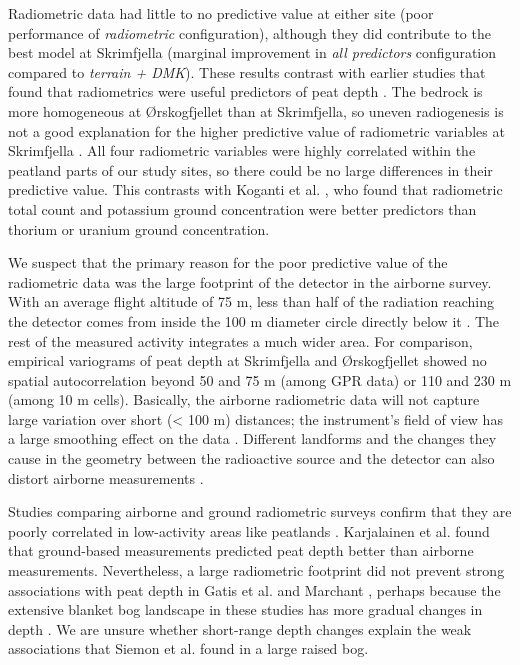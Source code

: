 \documentclass[soil, manuscript]{copernicus}
\begin{document}
Radiometric data had little to no predictive value at either site (poor performance of \emph{radiometric} configuration), although they did contribute to the best model at Skrimfjella (marginal improvement in \emph{all predictors} configuration compared to \emph{terrain + DMK}).
These results contrast with earlier studies that found that radiometrics were useful predictors of peat depth \citep{keaneySpatialStatisticsEstimate2013, gatisMappingUplandPeat2019, kogantiMappingPeatDepth2023, pohjankukkaDigitalMappingPeat2025}.
The bedrock is more homogeneous at Ørskogfjellet than at Skrimfjella, so uneven radiogenesis is not a good explanation for the higher predictive value of radiometric variables at Skrimfjella \citep{beamishEnvironmentalRadioactivityUK2014, reinhardtGammaraySpectrometryVersatile2019}.
All four radiometric variables were highly correlated within the peatland parts of our study sites, so there could be no large differences in their predictive value.
This contrasts with Koganti et al. \citeyearpar{kogantiMappingPeatDepth2023}, who found that radiometric total count and potassium ground concentration were better predictors than thorium or uranium ground concentration.

We suspect that the primary reason for the poor predictive value of the radiometric data was the large footprint of the detector in the airborne survey.
With an average flight altitude of 75 m, less than half of the radiation reaching the detector comes from inside the 100 m diameter circle directly below it \citep{beamishEnhancingResolutionAirborne2016, beamishDetailedMappingPeat2024}.
The rest of the measured activity integrates a much wider area.
For comparison, empirical variograms of peat depth at Skrimfjella and Ørskogfjellet showed no spatial autocorrelation beyond 50 and 75 m (among GPR data) or 110 and 230 m (among 10 m cells).
Basically, the airborne radiometric data will not capture large variation over short (\textless{} 100 m) distances; the instrument's field of view has a large smoothing effect on the data \citep{beamishEnhancingResolutionAirborne2016, reinhardtGammaraySpectrometryVersatile2019}.
Different landforms and the changes they cause in the geometry between the radioactive source and the detector can also distort airborne measurements \citep{reinhardtGammaraySpectrometryVersatile2019}.

Studies comparing airborne and ground radiometric surveys confirm that they are poorly correlated in low-activity areas like peatlands \citep{kockComparisonAirborneTerrestrial2011, karjalainenComparisonTwoGammaray2025}.
Karjalainen et al. \citeyearpar{karjalainenComparisonTwoGammaray2025} found that ground-based measurements predicted peat depth better than airborne measurements.
Nevertheless, a large radiometric footprint did not prevent strong associations with peat depth in Gatis et al. \citeyearpar{gatisMappingUplandPeat2019} and Marchant \citeyearpar{marchantUsingRemoteSensors2021}, perhaps because the extensive blanket bog landscape in these studies has more gradual changes in depth \citep{lindsayBogsEcologyClassification1995}.
We are unsure whether short-range depth changes explain the weak associations that Siemon et al. \citeyearpar{siemonAirborneElectromagneticRadiometric2020} found in a large raised bog.
\end{document}
